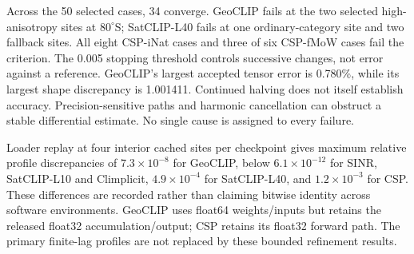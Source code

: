 Across the 50 selected cases, 34 converge. GeoCLIP fails at the two selected high-anisotropy sites at $80^\circ$S; SatCLIP-L40 fails at one ordinary-category site and two fallback sites. All eight CSP-iNat cases and three of six CSP-fMoW cases fail the criterion. The 0.005 stopping threshold controls successive changes, not error against a reference. GeoCLIP's largest accepted tensor error is 0.780\%, while its largest shape discrepancy is 1.001411. Continued halving does not itself establish accuracy. Precision-sensitive paths and harmonic cancellation can obstruct a stable differential estimate. No single cause is assigned to every failure.

Loader replay at four interior cached sites per checkpoint gives maximum relative profile discrepancies of $7.3\times10^{-8}$ for GeoCLIP, below $6.1\times10^{-12}$ for SINR, SatCLIP-L10 and Climplicit, $4.9\times10^{-4}$ for SatCLIP-L40, and $1.2\times10^{-3}$ for CSP. These differences are recorded rather than claiming bitwise identity across software environments. GeoCLIP uses float64 weights/inputs but retains the released float32 accumulation/output; CSP retains its float32 forward path. The primary finite-lag profiles are not replaced by these bounded refinement results.
